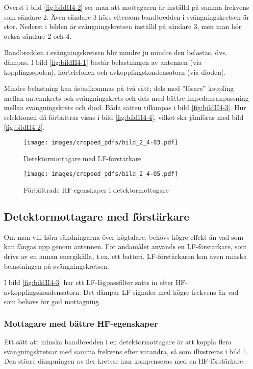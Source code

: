 Överst i bild \ref{fig:bildII4-2} ser man att mottagaren är inställd på
samma frekvens som sändare 2.
Även sändare 3 hörs eftersom bandbredden i svängningskretsen är stor.
Nederst i bilden är svängningskretsen inställd på sändare 3, men man hör
också sändare 2 och 4.

Bandbredden i svängningskretsen blir mindre ju mindre den belastas,
dvs. dämpas.
I bild \ref{fig:bildII4-1} består belastningen av antennen (via
kopplingsspolen), hörtelefonen och avkopplingskondensatorn (via dioden).

Mindre belastning kan åstadkommas på två sätt; dels med ''lösare''
koppling mellan antennkrets och svängningskrets och dels med bättre
impedansanpassning mellan svängningskrets och diod. Båda sätten
tillämpas i bild \ref{fig:bildII4-3}. Hur selektionen då förbättras visas i
bild \ref{fig:bildII4-4}, vilket ska jämföras med bild \ref{fig:bildII4-2}.

\begin{figure}
  \texttt{[image: images/cropped\_pdfs/bild\_2\_4-03.pdf]}
  \caption{Detektormottagare med LF-förstärkare}
  \label{fig:bildII4-3}

  \texttt{[image: images/cropped\_pdfs/bild\_2\_4-05.pdf]}
  \caption{Förbättrade HF-egenskaper i detektormottagare}
  \label{fig:bildII4-5}
\end{figure}

\subsection{Detektormottagare med förstärkare}

Om man vill höra sändningarna över högtalare, behövs högre effekt än
vad som kan fångas upp genom antennen.
För ändamålet används en LF-förstärkare, som drivs av en annan energikälla,
t.ex. ett batteri.
LF-förstärkaren kan även minska belastningen på svängningskretsen.

I bild \ref{fig:bildII4-3} har ett LF-lågpassfilter satts in efter
HF-avkopplingskondensatorn.
Det dämpar LF-signaler med högre frekvens än vad som behövs för god mottagning.

\subsubsection{Mottagare med bättre HF-egenskaper}

Ett sätt att minska bandbredden i en detektormottagare är att koppla
flera svängningskretsar med samma frekvens efter varandra, så som illustreras
i bild \ref{fig:bildII4-5}.
Den större dämpningen av fler kretsar kan kompenseras med en HF-förstärkare.

